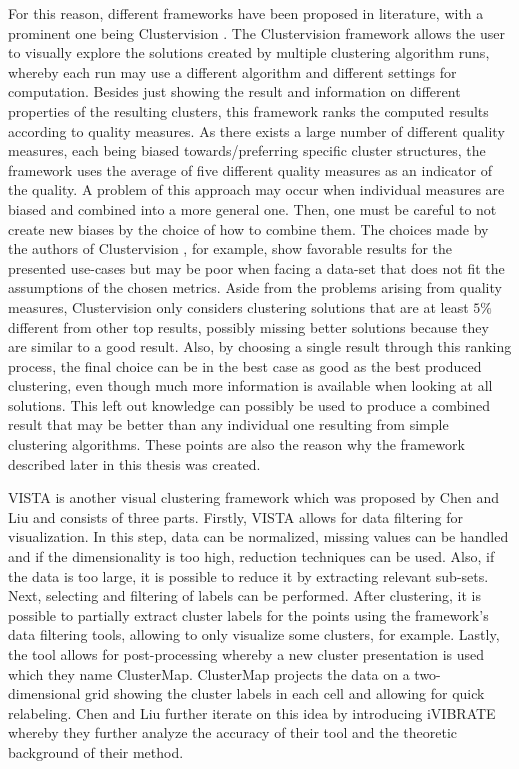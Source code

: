 \documentclass[
	a4paper,
	english,
	twoside,
	openright,               
	11pt                            
	]{report}
\begin{document}
For this reason, different frameworks have been proposed in literature, with a prominent one being Clustervision \cite{Kwon2018ClustervisionVS}. The Clustervision framework allows the user to visually explore the solutions created by multiple clustering algorithm runs, whereby each run may use a different algorithm and different settings for computation. Besides just showing the result and information on different properties of the resulting clusters, this framework ranks the computed results according to quality measures. As there exists a large number of different quality measures, each being biased towards/preferring specific cluster structures, the framework uses the average of five different quality measures as an indicator of the quality. A problem of this approach may occur when individual measures are biased and combined into a more general one. Then, one must be careful to not create new biases by the choice of how to combine them. The choices made by the authors of Clustervision \cite{Kwon2018ClustervisionVS}, for example, show favorable results for the presented use-cases but may be poor when facing a data-set that does not fit the assumptions of the chosen metrics. Aside from the problems arising from quality measures, Clustervision only considers clustering solutions that are at least $5\%$ different from other top results, possibly missing better solutions because they are similar to a good result. Also, by choosing a single result through this ranking process, the final choice can be in the best case as good as the best produced clustering, even though much more information is available when looking at all solutions. This left out knowledge can possibly be used to produce a combined result that may be better than any individual one resulting from simple clustering algorithms. These points are also the reason why the framework described later in this thesis was created.

VISTA \cite{VISTA} is another visual clustering framework which was proposed by Chen and Liu and consists of three parts. Firstly, VISTA allows for data filtering for visualization. In this step, data can be normalized, missing values can be handled and if the dimensionality is too high, reduction techniques can be used. Also, if the data is too large, it is possible to reduce it by extracting relevant sub-sets. Next, selecting and filtering of labels can be performed. After clustering, it is possible to partially extract cluster labels for the points using the framework's data filtering tools, allowing to only visualize some clusters, for example. Lastly, the tool allows for post-processing whereby a new cluster presentation is used which they name ClusterMap. ClusterMap projects the data on a two-dimensional grid showing the cluster labels in each cell and allowing for quick relabeling. Chen and Liu further iterate on this idea by introducing iVIBRATE \cite{10.1145/1148020.1148024} whereby they further analyze the accuracy of their tool and the theoretic background of their method.
\end{document}
